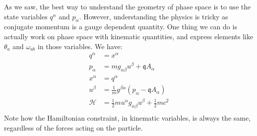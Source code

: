 As we saw, the best way to understand the geometry of phase space is to use the state variables $q^\alpha$ and $p_\alpha$. However, understanding the physics is tricky as conjugate momentum is a gauge dependent quantity. One thing we can do is actually work on phase space with kinematic quantities, and express elements like $\theta_a$ and $\omega_{ab}$ in those variables. We have:
\begin{equation}
	\begin{aligned}
		q^\alpha &= x^\alpha \\
		p_\alpha &= m g_{\alpha \beta} u^\beta + \mathfrak{q} A_\alpha \\
		x^\alpha &= q^\alpha \\
		u^\beta  &= \frac{1}{m} g^{\beta \alpha} \left( p_\alpha - \mathfrak{q} A_\alpha \right) \\
		\mathcal{H} &= \frac{1}{2} m u^\alpha g_{\alpha\beta} u^\beta + \frac{1}{2}mc^2  \\
	\end{aligned}
\end{equation}
Note how the Hamiltonian constraint, in kinematic variables, is always the same, regardless of the forces acting on the particle.

